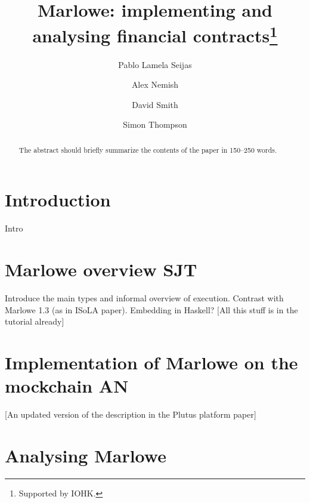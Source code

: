 \documentclass[runningheads]{llncs}
\begin{document}
%
\title{Marlowe: implementing and analysing financial contracts\thanks{Supported by IOHK.}}
%
%
\author{
Pablo {Lamela Seijas} \and
Alex Nemish \and
David Smith \and
Simon Thompson}
%

%
%
\maketitle              %
%



\begin{abstract}
The abstract should briefly summarize the contents of the paper in
150--250 words.

\end{abstract}
%
%
%


\section{Introduction}

Intro
\section{Marlowe overview SJT}

Introduce the main types and informal overview of execution. Contrast with Marlowe 1.3 (as in ISoLA paper). Embedding in Haskell? [All this stuff is in the tutorial already]

\section{Implementation of Marlowe on the mockchain AN}

 [An updated version of the description in the Plutus platform paper]

\section{Analysing Marlowe\label{sec:analysis}}
\end{document}
